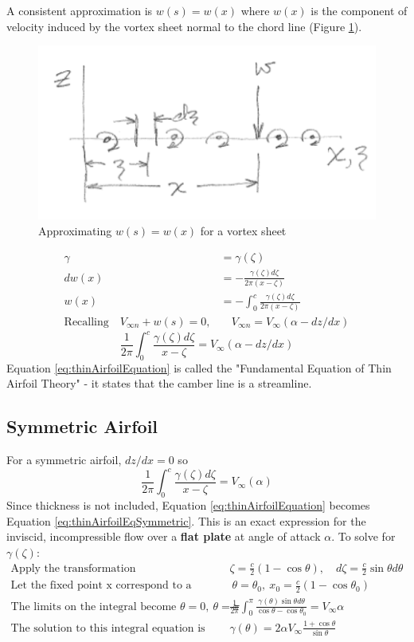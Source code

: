 \documentclass[draft=false, titlepage]{article}
\begin{document}
A consistent approximation is $w(s) = w(x)$ where $w(x)$ is the component of velocity induced by the vortex sheet normal to the chord line (Figure \ref{fig:vortexSheetApproximation}).
\begin{figure}[ht]
    \centering
    \includegraphics[width=0.4\linewidth]{Figures/vortexSheetApproximation.PNG}
    \caption{Approximating $w(s) = w(x)$ for a vortex sheet}
    \label{fig:vortexSheetApproximation}
\end{figure}
\begin{align*}
    \gamma &= \gamma(\zeta)\\
    dw(x) &= -\frac{\gamma(\zeta) d\zeta}{2\pi (x-\zeta)}\\
    w(x) &= -\int_0^c \frac{\gamma(\zeta)d\zeta}{2\pi (x-\zeta)}\\
    \text{Recalling} \quad V_{\infty n} + w(s) = 0,&\quad V_{\infty n}= V_\infty(\alpha - dz/dx)
\end{align*}
\begin{equation}
        \frac{1}{2\pi}\int_0^c \frac{\gamma(\zeta)d\zeta}{x-\zeta} = V_\infty (\alpha - dz/dx)
        \label{eq:thinAirfoilEquation}
\end{equation}
Equation \ref{eq:thinAirfoilEquation} is called the "Fundamental Equation of Thin Airfoil Theory" - it states that the camber line is a streamline.

\subsection{Symmetric Airfoil}
For a symmetric airfoil, $dz/dx=0$ so 
\begin{equation}
    \frac{1}{2\pi}\int_0^c \frac{\gamma(\zeta)d\zeta}{x-\zeta} = V_\infty (\alpha)
    \label{eq:thinAirfoilEqSymmetric}
\end{equation}
Since thickness is not included, Equation \ref{eq:thinAirfoilEquation} becomes Equation \ref{eq:thinAirfoilEqSymmetric}. This is an exact expression for the inviscid, incompressible flow over a \textbf{flat plate} at angle of attack $\alpha$. To solve for $\gamma(\zeta)$:
\begin{align*}
    \text{Apply the transformation} \quad& \zeta = \frac{c}{2}(1-\cos\theta),\quad d\zeta = \frac{c}{2} \sin \theta d\theta\\
    \text{Let the fixed point x correspond to a particular }&\ \theta = \theta_0,\ x_0 = \frac{c}{2} (1-\cos\theta_0)\\
    \text{The limits on the integral become } \theta = 0,\ \theta = \pi \quad& \frac{1}{2\pi} \int_0^\pi \frac{\gamma(\theta)\sin\theta d\theta}{\cos\theta - \cos\theta_0} = V_\infty \alpha\\
    \text{The solution to this integral equation is given by} \quad& \gamma(\theta) = 2\alpha V_\infty \frac{1+\cos\theta}{\sin\theta}
\end{align*}
\end{document}
